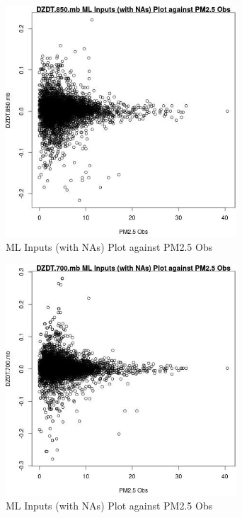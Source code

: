 \begin{figure} 
\centering  
\includegraphics[width=0.77\textwidth]{Code_Outputs/Report_ML_input_PM25_Step4_part_e_de_duplicated_aveswNAs_DZDT850mbvPM25_Obs.jpg} 
\caption{\label{fig:Report_ML_input_PM25_Step4_part_e_de_duplicated_aveswNAsDZDT850mbvPM25_Obs}ML Inputs (with NAs) Plot against PM2.5 Obs} 
\end{figure} 
 

\begin{figure} 
\centering  
\includegraphics[width=0.77\textwidth]{Code_Outputs/Report_ML_input_PM25_Step4_part_e_de_duplicated_aveswNAs_DZDT700mbvPM25_Obs.jpg} 
\caption{\label{fig:Report_ML_input_PM25_Step4_part_e_de_duplicated_aveswNAsDZDT700mbvPM25_Obs}ML Inputs (with NAs) Plot against PM2.5 Obs} 
\end{figure} 
 
